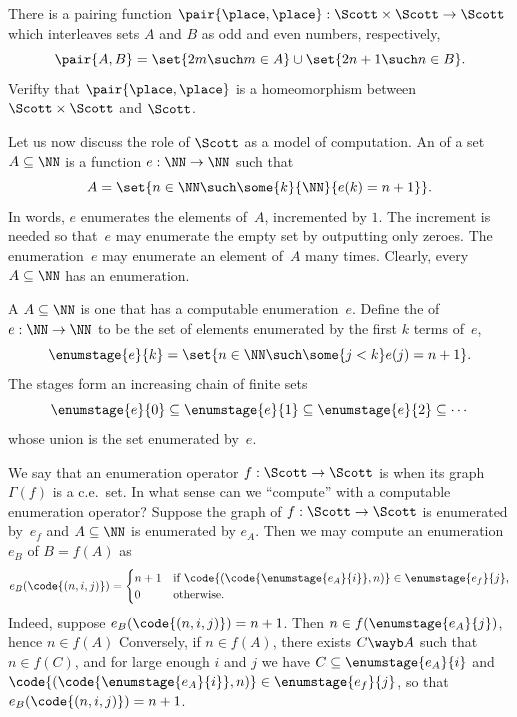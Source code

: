 \begin{exercise}
  There is a pairing function $\pair{\place, \place} : \Scott \times
  \Scott \to \Scott$ which interleaves sets $A$ and $B$ as odd and even
  numbers, respectively,
  \begin{equation*}
    \pair{A, B} = \set{2 m \such m \in A} \cup \set{2 n + 1 \such n \in B}.
  \end{equation*}
  Verifty that $\pair{\place, \place}$ is a homeomorphism between $\Scott \times \Scott$ and
  $\Scott$.
\end{exercise}

Let us now discuss the role of $\Scott$ as a model of computation. An
 of a set $A \subseteq \NN$ is a function $e : \NN
\to \NN$ such that
%
\begin{equation*}
  A = \set{n \in \NN \such \some{k}{\NN}{e(k) = n + 1}}.
\end{equation*}
%
In words, $e$ enumerates the elements of~$A$, incremented by $1$. The
increment is needed so that~$e$ may enumerate the empty set by
outputting only zeroes. The enumeration~$e$ may enumerate an element of~$A$ many times.
Clearly, every $A \subseteq \NN$ has an enumeration.

A  $A \subseteq \NN$ is one that has a computable enumeration~$e$.
Define the  of~$e : \NN \to \NN$ to be the set of elements enumerated by the first $k$ terms
of~$e$,
%
\begin{equation*}
  \enumstage{e}{k} = \set{n \in \NN \such \some{j < k} e(j) = n + 1}.
\end{equation*}
%
The stages form an increasing chain of finite sets
%
\begin{equation*}
  \enumstage{e}{0} \subseteq
  \enumstage{e}{1} \subseteq
  \enumstage{e}{2} \subseteq
  \cdots
\end{equation*}
%
whose union is the set enumerated by~$e$.

We say that an enumeration operator $f : \Scott \to \Scott$ is
 when its graph $\Gamma(f)$ is a c.e.~set. In what
sense can we ``compute'' with a computable enumeration operator?
Suppose the graph of $f : \Scott \to \Scott$ is enumerated by~$e_f$
and $A \subseteq \NN$ is enumerated by $e_A$. Then we may compute an
enumeration $e_B$ of $B = f(A)$ as
%
\begin{equation*}
  e_B(\code{(n, i, j)}) =
  \begin{cases}
    n + 1 & \text{if $\code{(\code{\enumstage{e_A}{i}}, n)} \in
      \enumstage{e_f}{j}$,}\\
    0 & \text{otherwise}.
  \end{cases}
\end{equation*}
%
Indeed, suppose $e_B(\code{(n,i,j)}) = n + 1$. Then $n \in
f(\enumstage{e_A}{j})$, hence $n \in f(A)$ Conversely, if $n \in
f(A)$, there exists $C \wayb A$ such that $n \in f(C)$, and for large
enough $i$ and $j$ we have $C \subseteq \enumstage{e_A}{i}$ and
$\code{(\code{\enumstage{e_A}{i}}, n)} \in \enumstage{e_f}{j}$, so
that $e_B(\code{(n, i, j)}) = n + 1$.

